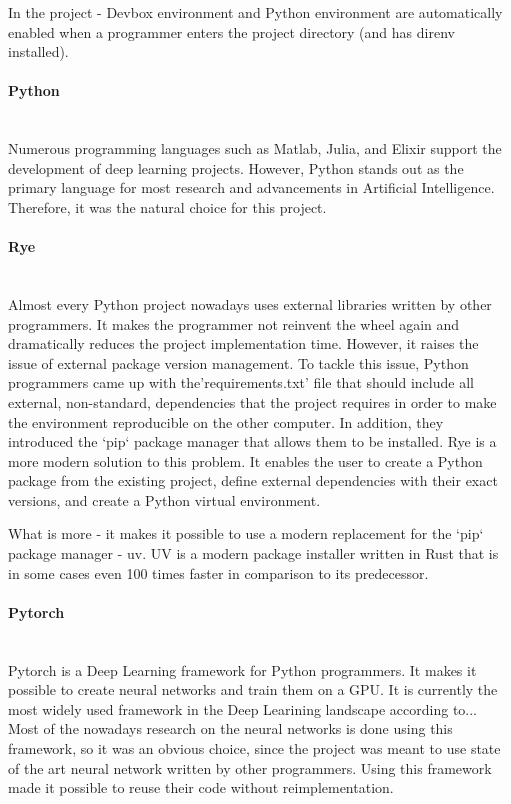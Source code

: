 In the project - Devbox environment and Python environment are automatically enabled when a programmer enters the project directory (and has direnv installed).
\paragraph{Python}\mbox{}\\
\indent Numerous programming languages such as Matlab, Julia, and Elixir support the development of deep learning projects. However, Python stands out as the primary language for most research and advancements in Artificial Intelligence. Therefore, it was the natural choice for this project.
\paragraph{Rye}\mbox{}\\
\indent Almost every Python project nowadays uses external libraries written by other programmers. It makes the programmer not reinvent the wheel again and dramatically reduces the project implementation time. However, it raises the issue of external package version management. To tackle this issue, Python programmers came up with the'requirements.txt' file that should include all external, non-standard, dependencies that the project requires in order to make the environment reproducible on the other computer. In addition, they introduced the `pip` package manager that allows them to be installed. 
Rye is a more modern solution to this problem. It enables the user to create a Python package from the existing project, define external dependencies with their exact versions, and create a Python virtual environment. 

What is more - it makes it possible to use a modern replacement for the `pip` package manager - uv. UV is a modern package installer written in Rust that is in some cases even 100 times faster in comparison to its predecessor.  
\paragraph{Pytorch}\mbox{}\\
\indent Pytorch is a Deep Learning framework for Python programmers. It makes it possible to create neural networks and train them on a GPU. It is currently the most widely used framework in the Deep Learining landscape according to... 
Most of the nowadays research on the neural networks is done using this framework, so it was an obvious choice, since the project was meant to use state of the art neural network written by other programmers. Using this framework made it possible to reuse their code without reimplementation. 
